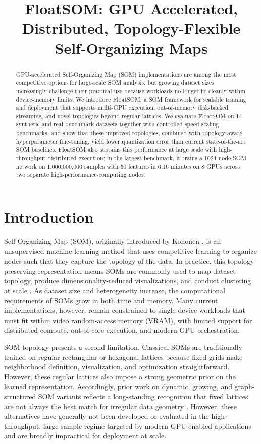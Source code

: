 \documentclass[10pt]{article} %
\title{FloatSOM: GPU Accelerated, Distributed, Topology-Flexible Self-Organizing Maps}
\author{}
\begin{document}
\maketitle

\begin{abstract}
GPU-accelerated Self-Organizing Map (SOM) implementations are among the most competitive options for large-scale SOM analysis, but growing dataset sizes increasingly challenge their practical use because workloads no longer fit cleanly within device-memory limits. We introduce FloatSOM, a SOM framework for scalable training and deployment that supports multi-GPU execution, out-of-memory disk-backed streaming, and novel topologies beyond regular lattices. We evaluate FloatSOM on 14 synthetic and real benchmark datasets together with controlled speed-scaling benchmarks, and show that these improved topologies, combined with topology-aware hyperparameter fine-tuning, yield lower quantization error than current state-of-the-art SOM baselines. FloatSOM also sustains this performance at large scale with high-throughput distributed execution; in the largest benchmark, it trains a 1024-node SOM network on 1,000,000,000 samples with 50 features in 6.16 minutes on 8 GPUs across two separate high-performance-computing nodes.
\end{abstract}

\section{Introduction}

Self-Organizing Map (SOM), originally introduced by Kohonen \citep{kohonenSelforganizingMap1990}, is an unsupervised machine-learning method that uses competitive learning to organize nodes such that they capture the topology of the data. In practice, this topology-preserving representation means SOMs are commonly used to map dataset topology, produce dimensionality-reduced visualizations, and conduct clustering at scale \citep{kangasVariantsSelforganizingMaps1990}. As dataset size and heterogeneity increase, the computational requirements of SOMs grow in both time and memory. Many current implementations, however, remain constrained to single-device workloads that must fit within video random-access memory (VRAM), with limited support for distributed compute, out-of-core execution, and modern GPU orchestration.

SOM topology presents a second limitation. Classical SOMs are traditionally trained on regular rectangular or hexagonal lattices because fixed grids make neighborhood definition, visualization, and optimization straightforward. However, these regular lattices also impose a strong geometric prior on the learned representation. Accordingly, prior work on dynamic, growing, and graph-structured SOM variants reflects a long-standing recognition that fixed lattices are not always the best match for irregular data geometry \citep{alahakoonDynamicSelforganizingMaps2000,vasighiDirectedBatchGrowing2017,kangasVariantsSelforganizingMaps1990}. However, these alternatives have generally not been developed or evaluated in the high-throughput, large-sample regime targeted by modern GPU-enabled applications and are broadly impractical for deployment at scale.
\end{document}
